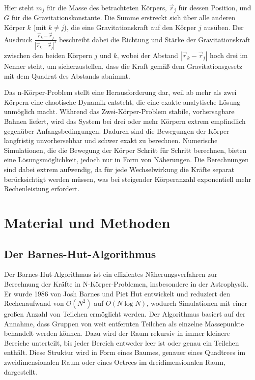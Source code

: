 \documentclass[a4paper,12pt,twoside]{article}
\begin{document}
Hier steht \( m_j \) für die Masse des betrachteten Körpers, \( \vec{r}_j \) für dessen Position, und \( G \) für die Gravitationskonstante. Die Summe erstreckt sich über alle anderen Körper \( k \) (mit \( k \neq j \)), die eine Gravitationskraft auf den Körper \( j \) ausüben. Der Ausdruck \( \frac{\vec{r}_k - \vec{r}_j}{|\vec{r}_k - \vec{r}_j|^3} \) beschreibt dabei die Richtung und Stärke der Gravitationskraft zwischen den beiden Körpern \( j \) und \( k \), wobei der Abstand \( |\vec{r}_k - \vec{r}_j| \) hoch drei im Nenner steht, um sicherzustellen, dass die Kraft gemäß dem Gravitationsgesetz mit dem Quadrat des Abstands abnimmt.

Das n-Körper-Problem stellt eine Herausforderung dar, weil ab mehr als zwei Körpern eine chaotische Dynamik entsteht, die eine exakte analytische Lösung unmöglich macht. Während das Zwei-Körper-Problem stabile, vorhersagbare Bahnen liefert, wird das System bei drei oder mehr Körpern extrem empfindlich gegenüber Anfangsbedingungen.
Dadurch sind die Bewegungen der Körper langfristig unvorhersehbar und schwer exakt zu berechnen. Numerische Simulationen, die die Bewegung der Körper Schritt für Schritt berechnen, bieten eine Lösungsmöglichkeit, jedoch nur in Form von Näherungen. Die Berechnungen sind dabei extrem aufwendig, da für jede Wechselwirkung die Kräfte separat berücksichtigt werden müssen, was bei steigender Körperanzahl exponentiell mehr Rechenleistung erfordert.


\section{Material und Methoden}

\subsection{Der Barnes-Hut-Algorithmus}
Der Barnes-Hut-Algorithmus ist ein effizientes Näherungsverfahren zur Berechnung der Kräfte in N-Körper-Problemen, insbesondere in der Astrophysik. Er wurde 1986 von Josh Barnes und Piet Hut entwickelt und reduziert den Rechenaufwand von $O(N^2)$ auf $O(N \log N)$, wodurch Simulationen mit einer großen Anzahl von Teilchen ermöglicht werden.
Der Algorithmus basiert auf der Annahme, dass Gruppen von weit entfernten Teilchen als einzelne Massepunkte behandelt werden können. Dazu wird der Raum rekursiv in immer kleinere Bereiche unterteilt, bis jeder Bereich entweder leer ist oder genau ein Teilchen enthält. Diese Struktur wird in Form eines Baumes, genauer eines Quadtrees im zweidimensionalen Raum oder eines Octrees im dreidimensionalen Raum, dargestellt.
\end{document}
